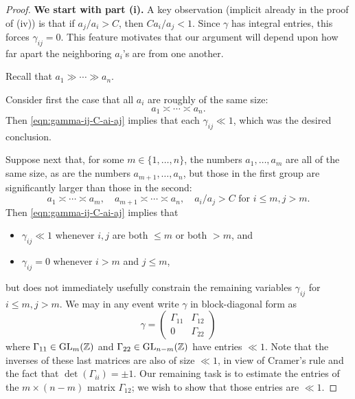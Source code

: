 \documentclass[reqno]{amsart} 
\begin{document}
\begin{proof} {\bf We start with part (i).}
  A key observation (implicit already in the proof of (iv)) is that if $a_j / a_{i} > C$, then $C a_i / a_j < 1$.  Since $\gamma$ has integral entries, this forces $\gamma_{i j} = 0$.  This feature motivates that our argument will depend upon how far apart the neighboring $a_i$'s are from one another.

  Recall that $a_1 \gg \dotsb \gg a_n$.

  Consider first the case that all $a_i$ are roughly of the same size:
  \begin{equation*}
    a_1 \asymp \dotsb \asymp a_n.
  \end{equation*}
  Then \eqref{eqn:gamma-ij-C-ai-aj} implies that each $\gamma_{i j} \ll 1$, which was the desired conclusion.


  Suppose next that, for some $m \in \{1, \dotsc, n\}$, the numbers $a_1,\dotsc,a_m$ are all of the same size, as are the numbers $a_{m+1},\dotsc,a_n$, but those in the first group are significantly larger than those in the second:
  \begin{equation}\label{eqn:two-groups-ai}
    a_1 \asymp \dotsb \asymp a_m,
    \quad
    a_{m+1} \asymp \dotsb \asymp a_n,
    \quad
    a_i / a_j > C
    \text{ for } i \leq m, j > m.
  \end{equation}
  Then \eqref{eqn:gamma-ij-C-ai-aj} implies that
  \begin{itemize}
  \item $\gamma_{i j} \ll 1$ whenever $i,j$ are both $\leq m$ or both $> m$, and
  \item $\gamma_{i j} = 0$ whenever $i > m$ and $j \leq m$,
  \end{itemize}
  but does not immediately usefully constrain the remaining variables $\gamma_{i j}$ for $i \leq m, j > m$.  We may in any event write $\gamma$ in block-diagonal form as
  \begin{equation*}
    \gamma =
    \begin{pmatrix}
      \Gamma_{1 1} &  \Gamma_{1 2} \\
      0 & \Gamma_{2 2}
    \end{pmatrix}
  \end{equation*}
  where $\Gamma_{11} \in \operatorname{GL}_m(\mathbb{Z})$ and $\Gamma_{2 2} \in \operatorname{GL}_{n-m}(\mathbb{Z})$ have entries $\ll 1$.  Note that the inverses of these last matrices are also of size $\ll 1$, in view of Cramer's rule and the fact that $\det(\Gamma_{i i}) = \pm 1$.  Our remaining task is to estimate the entries of the $m \times (n-m)$ matrix $\Gamma_{1 2}$; we wish to show that those entries are $\ll 1$.


\end{proof}
\end{document}
